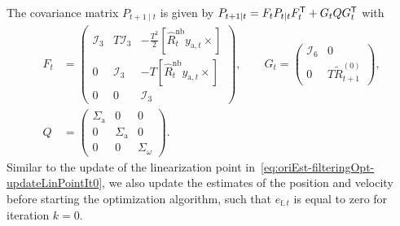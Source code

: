 The covariance matrix $P_{t+1 \mid t}$ is given by $P_{t+1 \mid t} = F_{t} P_{t \mid t} F_{t}^{\mathsf{T}} + G_{t} Q G_{t}^{\mathsf{T}}$ with
\begin{subequations}
\label{eq:app-estPose-timeUpdateFiltOpt}
\begin{align}
F_t &= \begin{pmatrix} \mathcal{I}_3 & T \mathcal{I}_3 & - \tfrac{T^2}{2}  [\hat{R}_t^\text{nb} y_{\text{a},t} \times] \\
0 & \mathcal{I}_3 & - T [\hat{R}_t^\text{nb} y_{\text{a},t} \times] \\
0 & 0 & \mathcal{I}_3 \end{pmatrix}
, \qquad
G_t = \begin{pmatrix} \mathcal{I}_6 & 0 \\ 0 & T \tilde{R}_{t+1}^{(0)} \end{pmatrix}, \label{eq:app-estPose-timeUpdateFiltOptFG} \\
Q &= \begin{pmatrix} \Sigma_\text{a} & 0 & 0 \\ 0 & \Sigma_\text{a} & 0 \\ 0 & 0 & \Sigma_\omega \end{pmatrix}.
\end{align}
\end{subequations}
Similar to the update of the linearization point in~\eqref{eq:oriEst-filteringOpt-updateLinPointIt0}, we also update the estimates of the position and velocity before starting the optimization algorithm, such that $e_{\text{f},t}$ is equal to zero for iteration $k = 0$.

